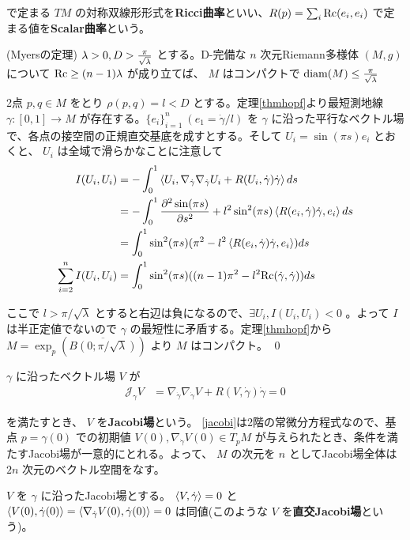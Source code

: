 \documentclass[dvipdfmx,a4paper]{jsreport}
\theoremstyle{definition}
\newcommand{\der}{\partial}
\renewcommand{\bar}{\overline}
\newcommand{\Rc}{{\rm Rc}}
\begin{document}
で定まる $TM$ の対称双線形形式を\textbf{Ricci曲率}といい、$R(p)=\sum_i \Rc(e_i,e_i)$ で定まる値を\textbf{Scalar曲率}という。

\thm\label{thmmyers} (Myersの定理) $\lambda>0,D>{\pi \over \sqrt{\lambda}}$ とする。D-完備な $n$ 次元Riemann多様体 $(M,g)$ について $\Rc \geq (n-1)\lambda$ が成り立てば、 $M$ はコンパクトで $\mbox{diam}(M) \leq {\pi \over \sqrt{\lambda}}$ 

\prf 2点 $p,q \in M$ をとり $\rho(p,q)=l<D$ とする。定理\ref{thmhopf}より最短測地線 $\gamma:[0,1] \to M$ が存在する。$\{e_i\}_{i=1}^n \ (e_1=\dot{\gamma}/l)$ を $\gamma$ に沿った平行なベクトル場で、各点の接空間の正規直交基底を成すとする。そして $U_i=\sin(\pi s)e_i$ とおくと、 $U_i$ は全域で滑らかなことに注意して
\begin{align*}
    I(U_i,U_i) &=-\int_0^1 \ev{U_i,\nabla_{\dot{\gamma}}\nabla_{\dot{\gamma}}U_i+R(U_i,\dot{\gamma})\dot{\gamma}} ds \\
    &=-\int_0^1 {\der^2 \sin(\pi s) \over \der s^2}+l^2\sin^2(\pi s) \ev{R(e_i,\dot{\gamma})\dot{\gamma},e_i} ds \\
    &=\int_0^1 \sin^2(\pi s)(\pi^2-l^2 \ev{R(e_i,\dot{\gamma})\dot{\gamma},e_i}) ds \\
    \sum_{i=2}^n I(U_i,U_i) &=\int_0^1 \sin^2(\pi s)((n-1)\pi^2-l^2 \Rc(\dot{\gamma},\dot{\gamma})) ds
\end{align*}

ここで $l>\pi/\sqrt{\lambda}$ とすると右辺は負になるので、$\exists U_i,I(U_i,U_i)<0$ 。よって $I$ は半正定値でないので $\gamma$ の最短性に矛盾する。定理\ref{thmhopf}から $M=\exp_p(\bar{B(0;\pi/\sqrt{\lambda})})$ より $M$ はコンパクト。 \qed

 $\gamma$ に沿ったベクトル場 $V$ が 
\begin{align}\label{jacobi}
    \mathcal{J}_\gamma V &=\nabla_{\dot{\gamma}}\nabla_{\dot{\gamma}}V+R(V,{\dot{\gamma}}){\dot{\gamma}}=0
\end{align}

を満たすとき、 $V$ を\textbf{Jacobi場}という。
\ref{jacobi}は2階の常微分方程式なので、基点 $p=\gamma(0)$ での初期値 $V(0),\nabla_{\dot{\gamma}}V(0) \in T_pM$ が与えられたとき、条件を満たすJacobi場が一意的にとれる。よって、 $M$ の次元を $n$ としてJacobi場全体は $2n$ 次元のベクトル空間をなす。

\lem\label{lemnormal} $V$ を $\gamma$ に沿ったJacobi場とする。
$\ev{V,\dot{\gamma}}=0$ と $\ev{V(0),\dot{\gamma}(0)}=\ev{\nabla_{\dot{\gamma}}V(0),\dot{\gamma}(0)}=0$ は同値(このような $V$ を\textbf{直交Jacobi場}という)。
\end{document}
